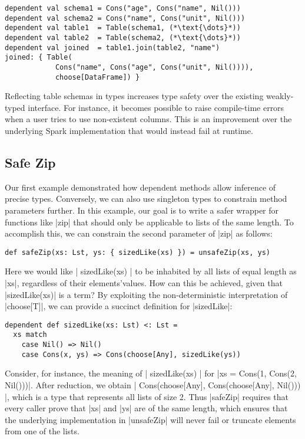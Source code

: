 \begin{lstlisting}
dependent val schema1 = Cons("age", Cons("name", Nil()))
dependent val schema2 = Cons("name", Cons("unit", Nil()))
dependent val table1  = Table(schema1, (*\text{\dots}*))
dependent val table2  = Table(schema2, (*\text{\dots}*))
dependent val joined  = table1.join(table2, "name")
joined: { Table(
            Cons("name", Cons("age", Cons("unit", Nil()))),
            choose[DataFrame]) }
\end{lstlisting}

\noindent
Reflecting table schemas in types increases type safety over the existing weakly-typed interface.
For instance, it becomes possible to raise compile-time errors when a user tries to use non-existent columns.
This is an improvement over the underlying Spark implementation that would instead fail at runtime.

\subsection{Safe Zip}
\label{safe-zip}

Our first example demonstrated how dependent methods allow inference of precise types.
Conversely, we can also use singleton types to constrain method parameters further.
In this example, our goal is to write a safer wrapper for functions like |zip| that should only be applicable to lists of the same length.
To accomplish this, we can constrain the second parameter of |zip| as follows:

\begin{lstlisting}
def safeZip(xs: Lst, ys: { sizedLike(xs) }) = unsafeZip(xs, ys)
\end{lstlisting}

\noindent
Here we would like |{ sizedLike(xs) }| to be inhabited by all lists of equal length as |xs|, regardless of their elements'values.
How can this be achieved, given that |sizedLike(xs)| is a term? By exploiting the non-deterministic interpretation of |choose[T]|, we can provide a succinct definition for |sizedLike|:

\begin{lstlisting}
dependent def sizedLike(xs: Lst) <: Lst =
  xs match
    case Nil() => Nil()
    case Cons(x, ys) => Cons(choose[Any], sizedLike(ys))
\end{lstlisting}

\noindent
Consider, for instance, the meaning of |{ sizedLike(xs) }| for |xs = Cons(1, Cons(2, Nil()))|.
After reduction, we obtain |{ Cons(choose[Any], Cons(choose[Any], Nil())) }|, which is a type that represents all lists of size 2.
Thus |safeZip| requires that every caller prove that |xs| and |ys| are of the same length, which ensures that the underlying implementation in |unsafeZip| will never fail or truncate elements from one of the lists.

